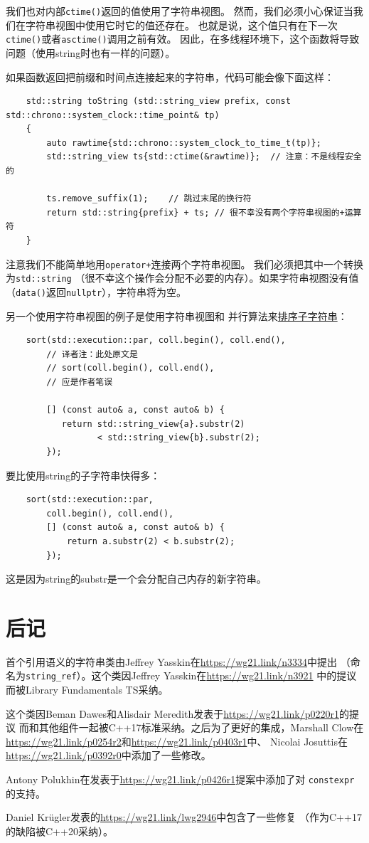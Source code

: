 我们也对内部\texttt{ctime()}返回的值使用了字符串视图。
然而，我们必须小心保证当我们在字符串视图中使用它时它的值还存在。
也就是说，这个值只有在下一次\texttt{ctime()}或者\texttt{asctime()}调用之前有效。
因此，在多线程环境下，这个函数将导致问题（使用string时也有一样的问题）。

如果函数返回把前缀和时间点连接起来的字符串，代码可能会像下面这样：
\begin{lstlisting}
    std::string toString (std::string_view prefix, const std::chrono::system_clock::time_point& tp)
    {
        auto rawtime{std::chrono::system_clock_to_time_t(tp)};
        std::string_view ts{std::ctime(&rawtime)};  // 注意：不是线程安全的

        ts.remove_suffix(1);    // 跳过末尾的换行符
        return std::string{prefix} + ts; // 很不幸没有两个字符串视图的+运算符
    }
\end{lstlisting}
注意我们不能简单地用\texttt{operator+}连接两个字符串视图。
我们必须把其中一个转换为\texttt{std::string}
（很不幸这个操作会分配不必要的内存）。如果字符串视图没有值
（\texttt{data()}返回\texttt{nullptr}），字符串将为空。

另一个使用字符串视图的例子是使用字符串视图和
并行算法来\hyperref[{ch22.1.2.1}]{排序子字符串}：
\begin{lstlisting}
    sort(std::execution::par, coll.begin(), coll.end(),
        // 译者注：此处原文是
        // sort(coll.begin(), coll.end(),
        // 应是作者笔误

        [] (const auto& a, const auto& b) {
           return std::string_view{a}.substr(2)
                  < std::string_view{b}.substr(2);
        });
\end{lstlisting}
要比使用string的子字符串快得多：
\begin{lstlisting}
    sort(std::execution::par,
        coll.begin(), coll.end(),
        [] (const auto& a, const auto& b) {
            return a.substr(2) < b.substr(2);
        });
\end{lstlisting}
这是因为string的substr是一个会分配自己内存的新字符串。


\section{后记}
首个引用语义的字符串类由Jeffrey Yasskin在\url{https://wg21.link/n3334}中提出
（命名为\texttt{string\_ref}）。这个类因Jeffrey Yasskin在\url{https://wg21.link/n3921}
中的提议而被Library Fundamentals TS采纳。

这个类因Beman Dawes和Alisdair Meredith发表于\url{https://wg21.link/p0220r1}的提议
而和其他组件一起被C++17标准采纳。之后为了更好的集成，Marshall Clow在
\url{https://wg21.link/p0254r2}和\url{https://wg21.link/p0403r1}中、
Nicolai Josuttis在\url{https://wg21.link/p0392r0}中添加了一些修改。

Antony Polukhin在发表于\url{https://wg21.link/p0426r1}提案中添加了对
\texttt{constexpr}的支持。

Daniel Krügler发表的\url{https://wg21.link/lwg2946}中包含了一些修复
（作为C++17的缺陷被C++20采纳）。